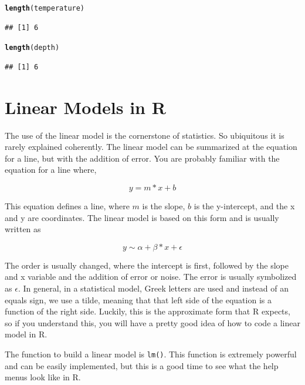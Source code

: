 \documentclass{tufte-handout}\usepackage[]{graphicx}\usepackage[]{xcolor}
\makeatletter
\newcommand{\hlstd}[1]{\textcolor[rgb]{0.345,0.345,0.345}{#1}}%
\newcommand{\hlkwd}[1]{\textcolor[rgb]{0.737,0.353,0.396}{\textbf{#1}}}%
\newenvironment{kframe}{%
 \def\at@end@of@kframe{}%
 \ifinner\ifhmode%
  \def\at@end@of@kframe{\end{minipage}}%
  \begin{minipage}{\columnwidth}%
 \fi\fi%
 \def\FrameCommand##1{\hskip\@totalleftmargin \hskip-\fboxsep
 \colorbox{shadecolor}{##1}\hskip-\fboxsep
     \hskip-\linewidth \hskip-\@totalleftmargin \hskip\columnwidth}%
 \MakeFramed {\advance\hsize-\width
   \@totalleftmargin\z@ \linewidth\hsize
   \@setminipage}}%
 {\par\unskip\endMakeFramed%
 \at@end@of@kframe}
\newenvironment{knitrout}{}{} %
\makeatother
\begin{document}
\begin{knitrout}
\color{fgcolor}\begin{kframe}
\begin{alltt}
\hlkwd{length}\hlstd{(temperature)}
\end{alltt}
\begin{verbatim}
## [1] 6
\end{verbatim}
\begin{alltt}
\hlkwd{length}\hlstd{(depth)}
\end{alltt}
\begin{verbatim}
## [1] 6
\end{verbatim}
\end{kframe}
\end{knitrout}


\section{Linear Models in R}

The use of the linear model is the cornerstone of statistics. So ubiquitous it is rarely explained coherently. The linear model can be summarized at the equation for a line, but with the addition of error. You are probably familiar with the equation for a line where, 

\begin{equation}
y = m * x + b
\end{equation}

This equation defines a line, where $m$ is the slope, $b$ is the y-intercept, and the x and y are coordinates. The linear model is based on this form and is usually written as  

\begin{equation}
y \sim \alpha + \beta * x + \epsilon
\end{equation}

The order is usually changed, where the intercept is first, followed by the slope and x variable and the addition of error or noise. The error is usually symbolized as $\epsilon$. In general, in a statistical model, Greek letters are used and instead of an equals sign, we use a tilde, meaning that that left side of the equation is a function of the right side. Luckily, this is the approximate form that R expects, so if you understand this, you will have a pretty good idea of how to code a linear model in R. 

The function to build a linear model is \texttt{lm()}. This function is extremely powerful and can be easily implemented, but this is a good time to see what the help menus look like in R. 
\end{document}
